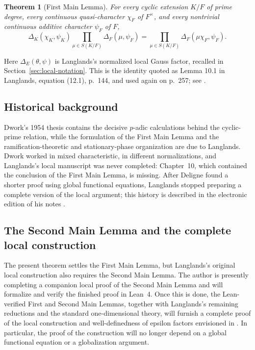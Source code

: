 \documentclass[11pt]{amsart}
\newtheorem{theorem}{Theorem}[section]
\theoremstyle{definition}
\theoremstyle{remark}
\begin{document}
\begin{theorem}[First Main Lemma]\label{thm:first-main}
For every cyclic extension $K/F$ of prime degree, every continuous
quasi-character $\chi_F$ of $F^\times$, and every nontrivial continuous
additive character $\psi_F$ of $F$,
\begin{equation}\label{eq:first-main}
 \Delta_K(\chi_K,\psi_K)
 \prod_{\mu\in S(K/F)}\Delta_F(\mu,\psi_F)
 =
 \prod_{\mu\in S(K/F)}\Delta_F(\mu\chi_F,\psi_F).
\end{equation}
\end{theorem}

Here $\Delta_E(\theta,\psi)$ is Langlands's normalized local Gauss
factor, recalled in Section~\ref{sec:local-notation}.  This is the
identity quoted as Lemma 10.1 in Langlands, equation (12.1), p.~144, and
used again on p.~257; see \cite[pp.~144, 257]{Langlands}.

\subsection*{Historical background}
Dwork's 1954 thesis \cite{Dwork} contains the decisive $p$-adic
calculations behind the cyclic-prime relation, while the formulation of
the First Main Lemma and the ramification-theoretic and stationary-phase
organization are due to Langlands.  Dwork worked in mixed
characteristic, in different normalizations, and Langlands's local
manuscript was never completed: Chapter~10, which contained the
conclusion of the First Main Lemma, is missing.  After Deligne found a
shorter proof using global functional equations, Langlands stopped
preparing a complete version of the local argument; this history is
described in the electronic edition of his notes \cite{Langlands}.

\subsection*{The Second Main Lemma and the complete local construction}
The present theorem settles the First Main Lemma, but Langlands's
original local construction also requires the Second Main Lemma.  The
author is presently completing a companion local proof of the Second
Main Lemma and will formalize and verify the finished proof in Lean~4.
Once this is done, the Lean-verified First and Second Main Lemmas,
together with Langlands's remaining reductions and the standard
one-dimensional theory, will furnish a complete proof of the local
construction and well-definedness of epsilon factors envisioned in
\cite{Langlands}.  In particular, the proof of the construction will no
longer depend on a global functional equation or a globalization
argument.
\end{document}
